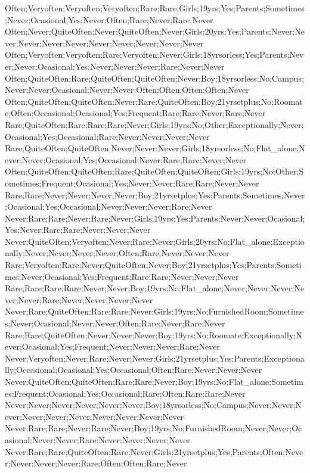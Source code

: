 Often;Veryoften;Veryoften;Veryoften;Rare;Rare;Girls;19yrs;Yes;Parents;Sometimes;Never;Ocasional;Yes;Never;Often;Rare;Never;Rare;Never
Often;Never;QuiteOften;Never;QuiteOften;Never;Girls;20yrs;Yes;Parents;Never;Never;Never;Never;Never;Never;Never;Never;Never;Never
Often;Veryoften;Veryoften;Rare;Veryoften;Never;Girls;18yrsorless;Yes;Parents;Never;Never;Ocasional;Yes;Never;Never;Never;Rare;Never;Never
Often;QuiteOften;Rare;QuiteOften;QuiteOften;Never;Boy;18yrsorless;No;Campus;Never;Never;Ocasional;Never;Never;Often;Often;Often;Often;Never
Often;QuiteOften;QuiteOften;Never;Rare;QuiteOften;Boy;21yrsetplus;No;Roomate;Often;Occasional;Ocasional;Yes;Frequent;Rare;Rare;Never;Rare;Never
Rare;QuiteOften;Rare;Rare;Rare;Never;Girls;19yrs;No;Other;Exceptionally;Never;Ocasional;Yes;Occasional;Rare;Never;Never;Never;Never
Rare;QuiteOften;QuiteOften;Never;Never;Never;Girls;18yrsorless;No;Flat_alone;Never;Never;Ocasional;Yes;Occasional;Never;Rare;Rare;Never;Never
Often;QuiteOften;QuiteOften;Rare;QuiteOften;QuiteOften;Girls;19yrs;No;Other;Sometimes;Frequent;Ocasional;Yes;Never;Never;Rare;Rare;Never;Never
Rare;Rare;Never;Never;Never;Never;Boy;21yrsetplus;Yes;Parents;Sometimes;Never;Ocasional;Yes;Occasional;Never;Never;Never;Rare;Never
Never;Rare;Rare;Never;Rare;Never;Girls;19yrs;Yes;Parents;Never;Never;Ocasional;Yes;Never;Rare;Rare;Never;Never;Never
Never;QuiteOften;Veryoften;Never;Rare;Never;Girls;20yrs;No;Flat_alone;Exceptionally;Never;Never;Never;Never;Often;Rare;Never;Never;Never
Rare;Veryoften;Rare;Never;QuiteOften;Never;Boy;21yrsetplus;Yes;Parents;Sometimes;Never;Ocasional;Yes;Frequent;Rare;Rare;Never;Never;Never
Rare;Rare;Rare;Rare;Never;Never;Boy;19yrs;No;Flat_alone;Never;Never;Never;Never;Never;Rare;Never;Never;Never;Never
Never;Rare;QuiteOften;Rare;Rare;Never;Girls;19yrs;No;FurnishedRoom;Sometimes;Never;Ocasional;Never;Never;Often;Rare;Never;Rare;Never
Rare;Rare;QuiteOften;Never;Never;Never;Boy;19yrs;No;Roomate;Exceptionally;Never;Ocasional;Yes;Frequent;Never;Never;Never;Rare;Never
Never;Veryoften;Never;Rare;Never;Never;Girls;21yrsetplus;Yes;Parents;Exceptionally;Occasional;Ocasional;Yes;Occasional;Often;Rare;Never;Never;Never
Never;QuiteOften;QuiteOften;Rare;Rare;Never;Boy;19yrs;No;Flat_alone;Sometimes;Frequent;Ocasional;Yes;Occasional;Rare;Often;Rare;Rare;Never
Never;Never;Never;Never;Never;Never;Boy;18yrsorless;No;Campus;Never;Never;Never;Never;Never;Never;Never;Never;Never;Never
Never;Rare;Rare;Never;Rare;Never;Boy;19yrs;No;FurnishedRoom;Never;Never;Ocasional;Never;Never;Rare;Never;Never;Never;Never
Never;Rare;Rare;QuiteOften;Rare;Never;Girls;21yrsetplus;Yes;Parents;Often;Never;Never;Never;Never;Rare;Often;Often;Rare;Never
